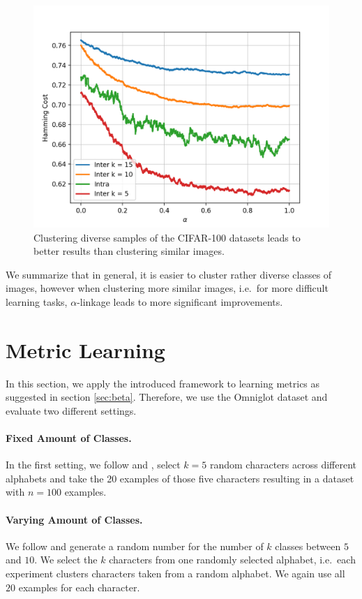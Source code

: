 \begin{figure}[H]
  \centering
  \includegraphics[width=.6\textwidth]{plots/cifar100}
  \caption{Clustering diverse samples of the CIFAR-100 datasets leads to better results than clustering similar images.}
  \label{fig:cifar100}
\end{figure}

We summarize that in general, it is easier to cluster rather diverse classes of images, however when clustering more similar images, i.e.\ for more difficult learning tasks, $\alpha$-linkage leads to more significant improvements.

\section{Metric Learning}
\label{sec:metric}

In this section, we apply the introduced framework to learning metrics as suggested in section \ref{sec:beta}. Therefore, we use the Omniglot dataset and evaluate two different settings.

\paragraph{Fixed Amount of Classes.} In the first setting, we follow \cite{NIPS2016_6385} and \cite{pmlr-v70-finn17a}, select $k = 5$ random characters across different alphabets and take the 20 examples of those five characters resulting in a dataset with $n = 100$ examples.

\paragraph{Varying Amount of Classes.} We follow \cite{DBLP:journals/corr/abs-1903-03096} and generate a random number for the number of $k$ classes between $5$ and $10$. We select the $k$ characters from one randomly selected alphabet, i.e.\ each experiment clusters characters taken from a random alphabet. We again use all $20$ examples for each character.


